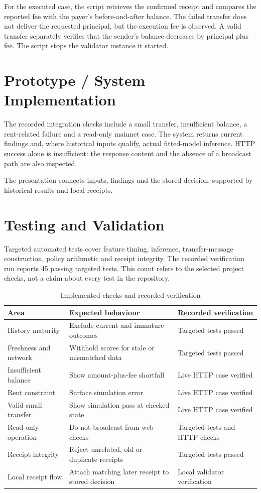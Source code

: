 \documentclass[12pt,a4paper,oneside]{report}
\begin{document}
For the executed case, the script retrieves the confirmed receipt and compares the reported fee with the payer's before-and-after balance. The failed transfer does not deliver the requested principal, but the execution fee is observed. A valid transfer separately verifies that the sender's balance decreases by principal plus fee. The script stops the validator instance it started.

\section{Prototype / System Implementation}
The recorded integration checks include a small transfer, insufficient balance, a rent-related failure and a read-only mainnet case. The system returns current findings and, where historical inputs qualify, actual fitted-model inference. HTTP success alone is insufficient: the response content and the absence of a broadcast path are also inspected.

The presentation connects inputs, findings and the stored decision, supported by historical results and local receipts.

\section{Testing and Validation}
Targeted automated tests cover feature timing, inference, transfer-message construction, policy arithmetic and receipt integrity. The recorded verification run reports 45 passing targeted tests. This count refers to the selected project checks, not a claim about every test in the repository.
\begin{table}[H]\centering\caption{Implemented checks and recorded verification}
\small\begin{tabularx}{\textwidth}{p{35mm}YY}\toprule Area&Expected behaviour&Recorded verification\\\midrule
History maturity&Exclude current and immature outcomes&Targeted tests passed\\
Freshness and network&Withhold scores for stale or mismatched data&Targeted tests passed\\
Insufficient balance&Show amount-plus-fee shortfall&Live HTTP case verified\\
Rent constraint&Surface simulation error&Live HTTP case verified\\
Valid small transfer&Show simulation pass at checked state&Live HTTP case verified\\
Read-only operation&Do not broadcast from web checks&Targeted tests and HTTP checks\\
Receipt integrity&Reject unrelated, old or duplicate receipts&Targeted tests passed\\
Local receipt flow&Attach matching later receipt to stored decision&Local validator verification\\\bottomrule\end{tabularx}\end{table}
\end{document}
